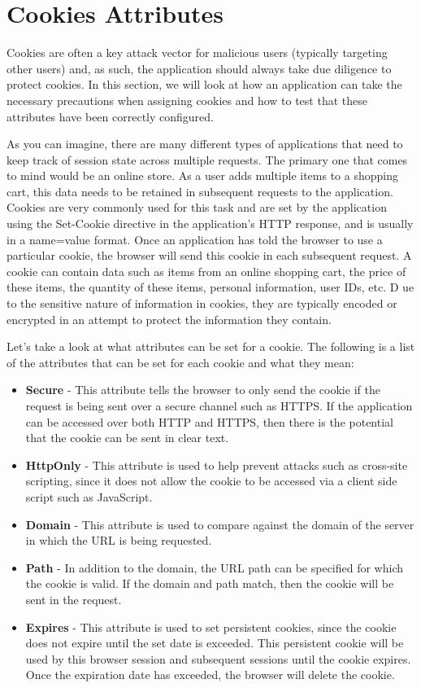 	\section{Cookies Attributes}

		Cookies are often a key attack vector for malicious users (typically targeting other users) 
		and, as such, the application should always take due diligence to protect cookies. In this 
		section, we will look at how an application can take the necessary precautions when assigning 
		cookies and how to test that these attributes have been correctly configured.

		As you can imagine, there are many different types of applications that need to keep track 
		of session state across multiple requests. The primary one that comes to mind would be an 
		online store. As a user adds multiple items to a shopping cart, this data needs to be retained 
		in subsequent requests to the application. Cookies are very commonly used for this task and 
		are set by the application using the Set-Cookie directive in the application's HTTP response, 
		and is usually in a name=value format. Once an application has told the browser to use a 
		particular cookie, the browser will send this cookie in each subsequent request. 
		A cookie can contain data such as items from an online shopping cart, the price of these items, 
		the quantity of these items, personal information, user IDs, etc. D
		ue to the sensitive nature of information in cookies, they are typically encoded or encrypted 
		in an attempt to protect the information they contain. 

		Let's take a look at what attributes can be set for a cookie. 
		The following is a list of the attributes that can be set for each cookie and 
		what they mean:

		\begin{itemize}
			\item {\bf Secure} - This attribute tells the browser to only send the cookie if the 
			request is being sent over a secure channel such as HTTPS. If the application can be 
			accessed over both HTTP and HTTPS, then there is the potential that the cookie can be 
			sent in clear text.
			\item {\bf HttpOnly} - This attribute is used to help prevent attacks such as cross-site
			scripting, since it does not allow the cookie to be accessed via a client side script 
			such as JavaScript. 
			\item {\bf Domain} - This attribute is used to compare against the domain of the server 
			in which the URL is being requested. 
			\item {\bf Path} - In addition to the domain, the URL path can be specified for which 
			the cookie is valid. If the domain and path match, then the cookie will be sent in the 
			request.
			\item {\bf Expires} - This attribute is used to set persistent cookies, since the cookie 
			does not expire until the set date is exceeded. This persistent cookie will be used by 
			this browser session and subsequent sessions until the cookie expires. Once the expiration 
			date has exceeded, the browser will delete the cookie.
		\end{itemize}

